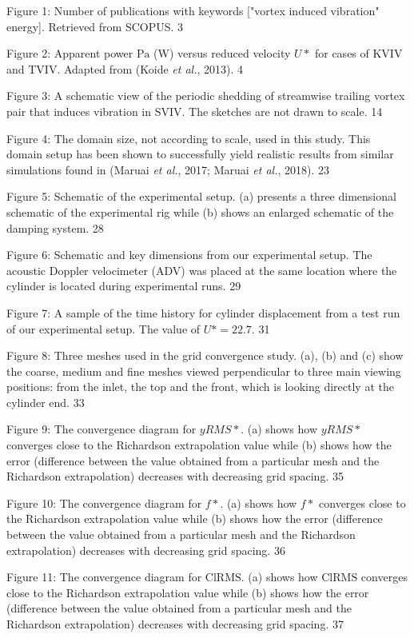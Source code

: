 \documentclass[]{article}
\begin{document}
Figure 1: Number of publications with keywords {[}"vortex induced
vibration" energy{]}. Retrieved from SCOPUS. 3

Figure 2: Apparent power \(\text{Pa}\) (W) versus reduced velocity
\(U*\) for cases of KVIV and TVIV. Adapted from (Koide \emph{et al.},
2013). 4

Figure 3: A schematic view of the periodic shedding of streamwise
trailing vortex pair that induces vibration in SVIV. The sketches are
not drawn to scale. 14

Figure 4: The domain size, not according to scale, used in this study.
This domain setup has been shown to successfully yield realistic results
from similar simulations found in (Maruai \emph{et al.}, 2017; Maruai
\emph{et al.}, 2018). 23

Figure 5: Schematic of the experimental setup. (a) presents a three
dimensional schematic of the experimental rig while (b) shows an
enlarged schematic of the damping system. 28

Figure 6: Schematic and key dimensions from our experimental setup. The
acoustic Doppler velocimeter (ADV) was placed at the same location where
the cylinder is located during experimental runs. 29

Figure 7: A sample of the time history for cylinder displacement from a
test run of our experimental setup. The value of \(U* = 22.7\). 31

Figure 8: Three meshes used in the grid convergence study. (a), (b) and
(c) show the coarse, medium and fine meshes viewed perpendicular to
three main viewing positions: from the inlet, the top and the front,
which is looking directly at the cylinder end. 33

Figure 9: The convergence diagram for \(yRMS*\). (a) shows how \(yRMS*\)
converges close to the Richardson extrapolation value while (b) shows
how the error (difference between the value obtained from a particular
mesh and the Richardson extrapolation) decreases with decreasing grid
spacing. 35

Figure 10: The convergence diagram for \(f*\). (a) shows how \(f*\)
converges close to the Richardson extrapolation value while (b) shows
how the error (difference between the value obtained from a particular
mesh and the Richardson extrapolation) decreases with decreasing grid
spacing. 36

Figure 11: The convergence diagram for \(\text{ClRMS}\). (a) shows how
\(\text{ClRMS}\) converges close to the Richardson extrapolation value
while (b) shows how the error (difference between the value obtained
from a particular mesh and the Richardson extrapolation) decreases with
decreasing grid spacing. 37
\end{document}
